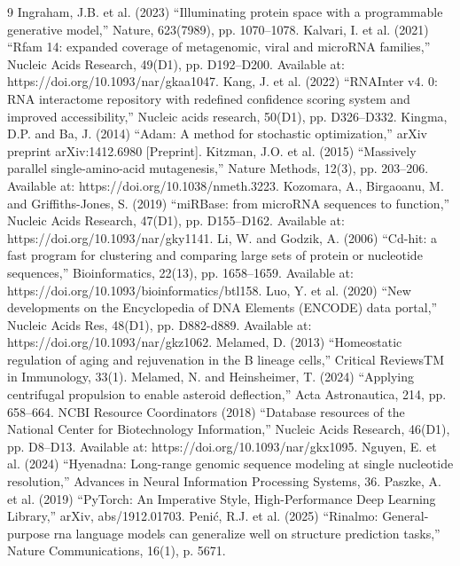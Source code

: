 \documentclass[11pt]{article}
\begin{document}
\begin{thebibliography}{9}
 Ingraham, J.B. et al. (2023) “Illuminating protein space with a programmable generative model,” Nature, 623(7989), pp. 1070–1078. 
 Kalvari, I. et al. (2021) “Rfam 14: expanded coverage of metagenomic, viral and microRNA families,” Nucleic Acids Research, 49(D1), pp. D192–D200. Available at: https://doi.org/10.1093/nar/gkaa1047. 
 Kang, J. et al. (2022) “RNAInter v4. 0: RNA interactome repository with redefined confidence scoring system and improved accessibility,” Nucleic acids research, 50(D1), pp. D326–D332. 
 Kingma, D.P. and Ba, J. (2014) “Adam: A method for stochastic optimization,” arXiv preprint arXiv:1412.6980 [Preprint]. 
 Kitzman, J.O. et al. (2015) “Massively parallel single-amino-acid mutagenesis,” Nature Methods, 12(3), pp. 203–206. Available at: https://doi.org/10.1038/nmeth.3223. 
 Kozomara, A., Birgaoanu, M. and Griffiths-Jones, S. (2019) “miRBase: from microRNA sequences to function,” Nucleic Acids Research, 47(D1), pp. D155–D162. Available at: https://doi.org/10.1093/nar/gky1141. 
 Li, W. and Godzik, A. (2006) “Cd-hit: a fast program for clustering and comparing large sets of protein or nucleotide sequences,” Bioinformatics, 22(13), pp. 1658–1659. Available at: https://doi.org/10.1093/bioinformatics/btl158. 
 Luo, Y. et al. (2020) “New developments on the Encyclopedia of DNA Elements (ENCODE) data portal,” Nucleic Acids Res, 48(D1), pp. D882-d889. Available at: https://doi.org/10.1093/nar/gkz1062. 
 Melamed, D. (2013) “Homeostatic regulation of aging and rejuvenation in the B lineage cells,” Critical ReviewsTM in Immunology, 33(1). 
 Melamed, N. and Heinsheimer, T. (2024) “Applying centrifugal propulsion to enable asteroid deflection,” Acta Astronautica, 214, pp. 658–664. 
 NCBI Resource Coordinators (2018) “Database resources of the National Center for Biotechnology Information,” Nucleic Acids Research, 46(D1), pp. D8–D13. Available at: https://doi.org/10.1093/nar/gkx1095. 
 Nguyen, E. et al. (2024) “Hyenadna: Long-range genomic sequence modeling at single nucleotide resolution,” Advances in Neural Information Processing Systems, 36. 
 Paszke, A. et al. (2019) “PyTorch: An Imperative Style, High-Performance Deep Learning Library,” arXiv, abs/1912.01703. 
 Penić, R.J. et al. (2025) “Rinalmo: General-purpose rna language models can generalize well on structure prediction tasks,” Nature Communications, 16(1), p. 5671. 

\end{thebibliography}
\end{document}
